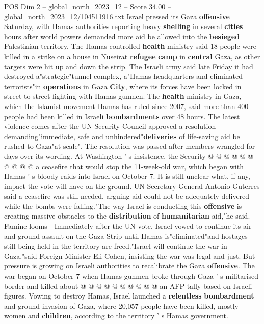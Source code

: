 \begin{textsample}{POS Dim 2 – global\_north\_2023\_12 – Score 34.00 – global\_north\_2023\_12/104511916.txt}  \label{ex:f2_pos_115}
Israel pressed its Gaza \textbf{offensive} Saturday, with Hamas authorities reporting heavy \textbf{shelling} in several \textbf{cities} hours after world powers demanded more aid be allowed into the \textbf{besieged} Palestinian territory.
The Hamas-controlled \textbf{health} ministry said 18 people were killed in a strike on a house in Nuseirat \textbf{refugee} \textbf{camp} in \textbf{central} Gaza, as other targets were hit up and down the strip.
The Israeli army said late Friday it had destroyed a"strategic"tunnel complex, a"Hamas headquarters and eliminated terrorists"in \textbf{operations} in Gaza \textbf{City}, where its forces have been locked in street-to-street fighting with Hamas gunmen.
The \textbf{health} ministry in Gaza, which the Islamist movement Hamas has ruled since 2007, said more than 400 people had been killed in Israeli \textbf{bombardments} over 48 hours.
The latest violence comes after the UN Security Council approved a resolution demanding"immediate, safe and unhindered"\textbf{deliveries} of life-saving aid be rushed to Gaza"at scale".
The resolution was passed after members wrangled for days over its wording.
At Washington ' s insistence, the Security @ @ @ @ @ @ @ @ @ @ a ceasefire that would stop the 11-week-old war, which began with Hamas ' s bloody raids into Israel on October 7.
It is still unclear what, if any, impact the vote will have on the ground.
UN Secretary-General Antonio Guterres said a ceasefire was still needed, arguing aid could not be adequately delivered while the bombs were falling."The way Israel is conducting this \textbf{offensive} is creating massive obstacles to the \textbf{distribution} of \textbf{humanitarian} aid,"he said. - Famine looms - Immediately after the UN vote, Israel vowed to continue its air and ground assault on the Gaza Strip until Hamas is"eliminated"and hostages still being held in the territory are freed."Israel will continue the war in Gaza,"said Foreign Minister Eli Cohen, insisting the war was legal and just.
But pressure is growing on Israeli authorities to recalibrate the Gaza \textbf{offensive}.
The war began on October 7 when Hamas gunmen broke through Gaza ' s militarised border and killed about @ @ @ @ @ @ @ @ @ @ an AFP tally based on Israeli figures.
Vowing to destroy Hamas, Israel launched a \textbf{relentless} \textbf{bombardment} and ground invasion of Gaza, where 20,057 people have been killed, mostly women and \textbf{children}, according to the territory ' s Hamas government.

\end{textsample}

